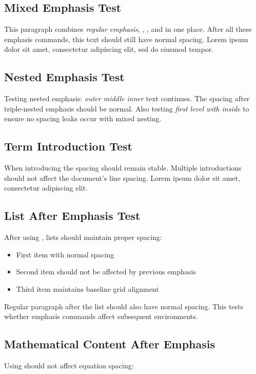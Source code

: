 \documentclass[11pt]{article}
\begin{document}
\subsection{Mixed Emphasis Test}
This paragraph combines \emph{regular emphasis}, ,
, and  in one place. After
all these emphasis commands, this text should still have normal spacing. Lorem
ipsum dolor sit amet, consectetur adipiscing elit, sed do eiusmod tempor.

\subsection{Nested Emphasis Test}
Testing nested emphasis: \emph{outer \emph{middle \emph{inner}}} text continues.
The spacing after triple-nested emphasis should be normal. Also testing 
\emph{first level with  inside} to ensure no
spacing leaks occur with mixed nesting.

\subsection{Term Introduction Test}
When introducing  the spacing should remain stable.
Multiple  introductions should not affect the
document's line spacing. Lorem ipsum dolor sit amet, consectetur adipiscing elit.

\subsection{List After Emphasis Test}
After using , lists should maintain proper spacing:

\begin{itemize}
\item First item with normal spacing
\item Second item should not be affected by previous emphasis
\item Third item maintains baseline grid alignment
\end{itemize}

Regular paragraph after the list should also have normal spacing. This tests
whether emphasis commands affect subsequent environments.

\subsection{Mathematical Content After Emphasis}
Using  should not affect equation spacing:
\end{document}
